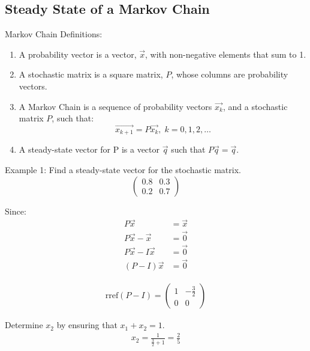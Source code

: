 \subsection{Steady State of a Markov Chain}
\begin{definition} Markov Chain Definitions:
    \begin{enumerate}
        \item A probability vector is a vector, \(\Vec{x}\), with non-negative elements that sum to 1.
        \item A stochastic matrix is a square matrix, \(P\), whose columns are probability vectors.
        \item A Markov Chain is a sequence of probability vectors \(\Vec{x_k}\), and a stochastic matrix \(P\), such that:
        \[\Vec{x_{k+1}} = P \Vec{x_k},\; k=0,1,2,\dots\]
        \item A steady-state vector for P is a vector \(\Vec{q}\) such that \(P\Vec{q}=\Vec{q}\).
    \end{enumerate}
\end{definition}


\noindent
Example 1: Find a steady-state vector for the stochastic matrix.
\begin{equation}
    \begin{pmatrix}
        0.8 & 0.3 \\
        0.2 & 0.7
    \end{pmatrix}
\end{equation}

\noindent
Since:
\begin{align}
    P \Vec{x} &= \Vec{x} \\
    P \Vec{x} - \Vec{x} &= \Vec{0} \\
    P \Vec{x} - I \Vec{x} &= \Vec{0} \\
    (P - I) \Vec{x} &= \Vec{0}
\end{align}

\begin{align}
    \text{rref}(P - I) = \begin{pmatrix}
        1 & - \frac{3}{2} \\
        0 & 0
    \end{pmatrix}
\end{align}

\noindent
Determine \(x_2\) by ensuring that \(x_1 + x_2 = 1\).
\begin{align}
    x_2 = \frac{1}{\frac{3}{2}+1} = \frac{2}{5}
\end{align}


